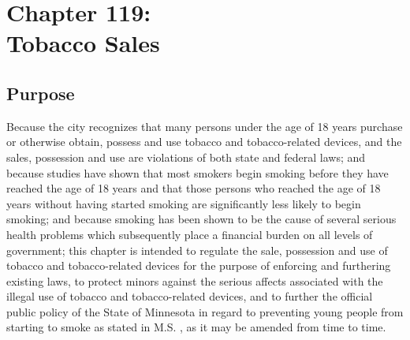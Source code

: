 \chapter*{Chapter 119: \\
	Tobacco Sales}
    \vfill
    \minitoc
    \pagebreak

\section{Purpose}
Because the city recognizes that many persons under the age of 18 years purchase or otherwise obtain, possess and use tobacco and tobacco-related devices, and the sales, possession and use are violations of both state and federal laws; and because studies have shown that most smokers begin smoking before they have reached the age of 18 years and that those persons who reached the age of 18 years without having started smoking are significantly less likely to begin smoking; and because smoking has been shown to be the cause of several serious health problems which subsequently place a financial burden on all levels of government; this chapter is intended to regulate the sale, possession and use of tobacco and tobacco-related devices for the purpose of enforcing and furthering existing laws, to protect minors against the serious affects associated with the illegal use of tobacco and tobacco-related devices, and to further the official public policy of the State of Minnesota in regard to preventing young people from starting to smoke as stated in M.S. , as it may be amended from time to time.

